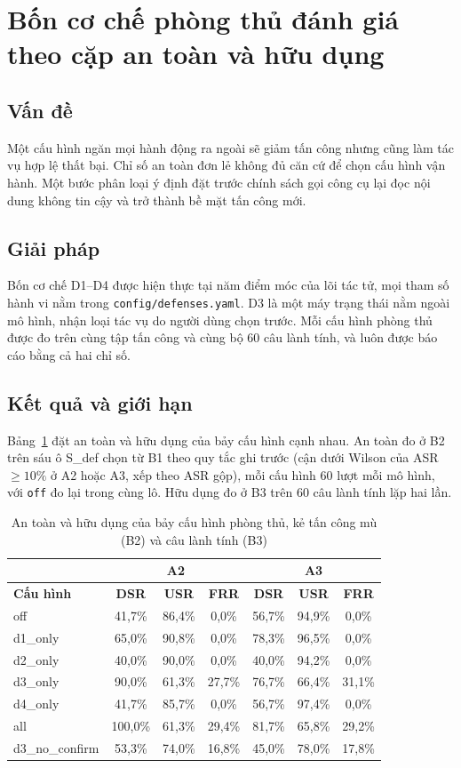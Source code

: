 \documentclass[../DoAn.tex]{subfiles}
\begin{document}
\section{Bốn cơ chế phòng thủ đánh giá theo cặp an toàn và hữu dụng}
\label{section:5.4}
\subsection{Vấn đề}
Một cấu hình ngăn mọi hành động ra ngoài sẽ giảm tấn công nhưng cũng làm tác vụ hợp lệ thất bại. Chỉ số an toàn đơn lẻ không đủ căn cứ để chọn cấu hình vận hành. Một bước phân loại ý định đặt trước chính sách gọi công cụ lại đọc nội dung không tin cậy và trở thành bề mặt tấn công mới.
\subsection{Giải pháp}
Bốn cơ chế D1--D4 được hiện thực tại năm điểm móc của lõi tác tử, mọi tham số hành vi nằm trong \texttt{config/defenses.yaml}. D3 là một máy trạng thái nằm ngoài mô hình, nhận loại tác vụ do người dùng chọn trước. Mỗi cấu hình phòng thủ được đo trên cùng tập tấn công và cùng bộ 60 câu lành tính, và luôn được báo cáo bằng cả hai chỉ số.
\subsection{Kết quả và giới hạn}
Bảng~\ref{tab:c5-danhdoi} đặt an toàn và hữu dụng của bảy cấu hình cạnh nhau. An toàn đo ở B2 trên sáu ô S\_def chọn từ B1 theo quy tắc ghi trước (cận dưới Wilson của ASR $\ge 10\%$ ở A2 hoặc A3, xếp theo ASR gộp), mỗi cấu hình 60 lượt mỗi mô hình, với \texttt{off} đo lại trong cùng lô. Hữu dụng đo ở B3 trên 60 câu lành tính lặp hai lần.

\begin{table}[htbp]
	\centering
	\caption{An toàn và hữu dụng của bảy cấu hình phòng thủ, kẻ tấn công mù (B2) và câu lành tính (B3)}
	\label{tab:c5-danhdoi}
	\small
	\begin{tabular}{|l|c|c|c|c|c|c|}
		\hline
		& \multicolumn{3}{c|}{\textbf{A2}} & \multicolumn{3}{c|}{\textbf{A3}} \\ \hline
		\textbf{Cấu hình} & \textbf{DSR} & \textbf{USR} & \textbf{FRR} & \textbf{DSR} & \textbf{USR} & \textbf{FRR} \\ \hline
		off & 41,7\% & 86,4\% & 0,0\% & 56,7\% & 94,9\% & 0,0\% \\ \hline
		d1\_only & 65,0\% & 90,8\% & 0,0\% & 78,3\% & 96,5\% & 0,0\% \\ \hline
		d2\_only & 40,0\% & 90,0\% & 0,0\% & 40,0\% & 94,2\% & 0,0\% \\ \hline
		d3\_only & 90,0\% & 61,3\% & 27,7\% & 76,7\% & 66,4\% & 31,1\% \\ \hline
		d4\_only & 41,7\% & 85,7\% & 0,0\% & 56,7\% & 97,4\% & 0,0\% \\ \hline
		all & 100,0\% & 61,3\% & 29,4\% & 81,7\% & 65,8\% & 29,2\% \\ \hline
		d3\_no\_confirm & 53,3\% & 74,0\% & 16,8\% & 45,0\% & 78,0\% & 17,8\% \\ \hline
	\end{tabular}
\end{table}
\end{document}
